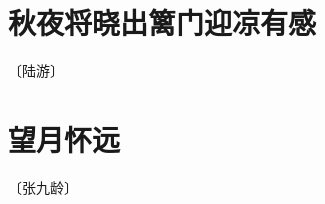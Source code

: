 \documentclass[12pt,UTF-8,openany]{ctexbook}
\begin{document}
\vspace{8pt}


\section{秋夜将晓出篱门迎凉有感}

\begin{center}
    \vspace{10pt}
    
    \begin{normalsize}
        
        〔陆游〕
        
    \end{normalsize}
    
    \vspace{8pt}
    
    \begin{large}
        
        
        
    \end{large}
    
\end{center}

\vspace{8pt}


\section{望月怀远}

\begin{center}
    \vspace{10pt}
    
    \begin{normalsize}
        
        〔张九龄〕
        
    \end{normalsize}
    
    \vspace{8pt}
    
    \begin{large}
        
        
        
        
        
    \end{large}
    
\end{center}
\end{document}
